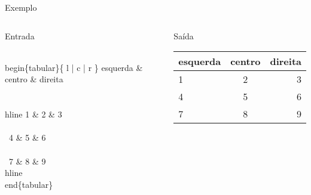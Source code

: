 \begin{frame}[fragile]{Exemplo}
    
    \begin{columns}
    \column{7cm}
    \begin{block}{Entrada}
        \begin{semiverbatim}
\footnotesize\\begin\{tabular\}\{ l | c | r \}
esquerda \& centro \& direita \\\\
\\hline
1 \& 2 \& 3 \\\\
\\cline{2-2}
4 \& 5 \& 6 \\\\
\\cline{2-2}
7 \& 8 \& 9 
\\hline
\\end\{tabular\}
\end{semiverbatim}
    \end{block}

    \begin{block}{Saída}
        \begin{tabular}{l|c|r}
        esquerda & centro & direita \\
        \hline
        1 & 2 & 3 \\
        \cline{2-2}
        4 & 5 & 6 \\
        \cline{2-2}
        7 & 8 & 9 \\
        \hline
        \end{tabular}
    \end{block}
    \end{columns}
\end{frame}

